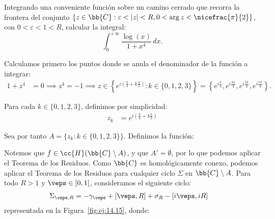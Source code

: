 \documentclass[12pt]{article}
\begin{document}
    \begin{ejercicio}[2.5 puntos]\label{ej:14.15}
        Integrando una conveniente función sobre un camino cerrado que recorra la frontera del conjunto $\{z \in \bb{C} : \varepsilon < |z| < R, 0 < \arg z < \nicefrac{\pi}{2}\}$, con $0 < \varepsilon < 1 < R$, calcular la integral:
        \begin{equation*}
            \int_0^{+\infty} \frac{\log(x)}{1 + x^4} \, dx.
        \end{equation*}

        Calculamos primero los puntos donde se anula el denominador de la función a integrar:
    \begin{align*}
        1 + z^4 &= 0 \implies z^4 = -1 \implies z\in \left\{e^{i\left(\frac{\pi}{4} + k\frac{\pi}{2}\right)} : k\in \{0, 1, 2, 3\}\right\}
        = \left\{e^{i\frac{\pi}{4}}, e^{i\frac{3\pi}{4}}, e^{i\frac{5\pi}{4}}, e^{i\frac{7\pi}{4}}\right\}.
    \end{align*}

    Para cada $k\in \{0, 1, 2, 3\}$, definimos por simplicidad:
    \begin{align*}
        z_k &= e^{i\left(\frac{\pi}{4} + k\frac{\pi}{2}\right)}
    \end{align*}

    Sea por tanto $A = \{z_k : k\in \{0, 1, 2, 3\}\}$. Definimos la función:

    Notemos que $f\in \cc{H}(\bb{C}\setminus A)$, y que $A'=\emptyset$, por lo que podemos aplicar el Teorema de los Residuos. Como $\bb{C}$ es homológicamente conexo, podemos aplicar el Teorema de los Residuos para cualquier ciclo $\Sigma$ en $\bb{C}\setminus A$. Para todo $R>1$ y $\veps\in \left]0, 1\right[$, consideramos el siguiente ciclo:
    \begin{align*}
        \Sigma_{\veps, R} &= -\gamma_{\veps} + [\veps, R] + \sigma_R - [i\veps, iR]
    \end{align*}
    representada en la Figura~\ref{fig:ej:14.15}, donde:
    \begin{figure}
        \centering
\end{figure}
\end{ejercicio}
\end{document}
